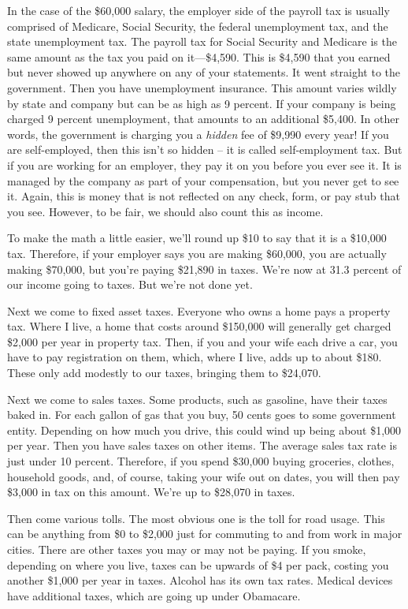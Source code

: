 In the case of the \$60,000 salary, the employer side of the payroll tax
is usually comprised of Medicare, Social Security, the federal
unemployment tax, and the state unemployment tax. The payroll tax for
Social Security and Medicare is the same amount as the tax you paid on
it—\$4,590. This is \$4,590 that you earned but never showed up
anywhere on any of your statements. It went straight to the government.
Then you have unemployment insurance. This amount varies wildly by
state and company but can be as high as 9 percent. If your company is
being charged 9 percent unemployment, that amounts to an additional
\$5,400. In other words, the government is charging you a
\textit{hidden} fee of \$9,990 every year!  If you are self-employed,
then this isn't so hidden – it is called
self-employment tax.  But if you are working for an employer, they pay
it on you before you ever see it.  It is managed by the company as part
of your compensation, but you never get to see it.  Again, this is
money that is not reflected on any check, form, or pay stub that you
see. However, to be fair, we should also count this as income.

To make the math a little easier, we’ll round up \$10 to say that it is
a \$10,000 tax. Therefore, if your employer says you are making
\$60,000, you are actually making \$70,000, but you’re paying \$21,890
in taxes. We’re now at 31.3 percent of our income going to taxes. But
we’re not done yet.

Next we come to fixed asset taxes. Everyone who owns a home pays a
property tax. Where I live, a  home that costs around \$150,000 will generally get
charged \$2,000 per year in property tax. Then, if you and your wife
each drive a car, you have to pay registration on them, which, where I
live, adds up to about \$180. These only add modestly to our taxes,
bringing them to \$24,070.

Next we come to sales taxes. Some products, such as gasoline, have their
taxes baked in. For each gallon of gas that you buy, 50 cents goes to
some government entity. Depending on how much you drive, this could
wind up being about \$1,000 per year. Then you have sales taxes on
other items. The average sales tax rate is just under 10 percent.
Therefore, if you
spend \$30,000 buying groceries, clothes, household goods, and, of
course, taking your wife out on
dates, you will then
pay \$3,000 in tax on this amount.
We’re up to \$28,070
in taxes. 

Then come various
tolls. The most obvious one is the toll for road usage. This can be
anything from \$0 to \$2,000 just for commuting to and from work in
major cities.  There are other taxes you may or may not be paying. If
you smoke, depending on where you live, taxes can be upwards of \$4 per
pack, costing you another \$1,000 per year in taxes. Alcohol has its
own tax rates. Medical devices have additional taxes, which are going
up under Obamacare.

